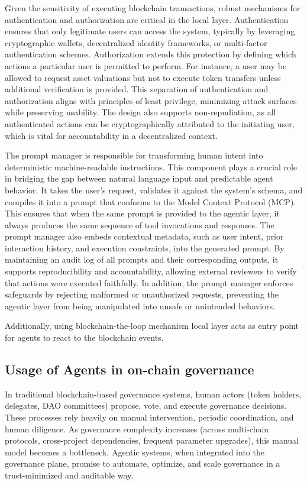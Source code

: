 Given the sensitivity of executing blockchain transactions, robust mechanisms for authentication and authorization are critical in the local layer. Authentication ensures that only legitimate users can access the system, typically by leveraging cryptographic wallets, decentralized identity frameworks, or multi-factor authentication schemes. Authorization extends this protection by defining which actions a particular user is permitted to perform. For instance, a user may be allowed to request asset valuations but not to execute token transfers unless additional verification is provided. This separation of authentication and authorization aligns with principles of least privilege, minimizing attack surfaces while preserving usability. The design also supports non-repudiation, as all authenticated actions can be cryptographically attributed to the initiating user, which is vital for accountability in a decentralized context.

The prompt manager is responsible for transforming human intent into deterministic machine-readable instructions. This component plays a crucial role in bridging the gap between natural language input and predictable agent behavior. It takes the user’s request, validates it against the system’s schema, and compiles it into a prompt that conforms to the Model Context Protocol (MCP). This ensures that when the same prompt is provided to the agentic layer, it always produces the same sequence of tool invocations and responses. The prompt manager also embeds contextual metadata, such as user intent, prior interaction history, and execution constraints, into the generated prompt. By maintaining an audit log of all prompts and their corresponding outputs, it supports reproducibility and accountability, allowing external reviewers to verify that actions were executed faithfully. In addition, the prompt manager enforces safeguards by rejecting malformed or unauthorized requests, preventing the agentic layer from being manipulated into unsafe or unintended behaviors.


Additionally, using blockchain-the-loop mechanism local layer acts as entry point for agents to react to the blockchain events.

\subsection{Usage of Agents in on-chain governance}

In traditional blockchain-based governance systems, human actors (token holders, delegates, DAO committees) propose, vote, and execute governance decisions. These processes rely heavily on manual intervention, periodic coordination, and human diligence. As governance complexity increases (across multi-chain protocols, cross-project dependencies, frequent parameter upgrades), this manual model becomes a bottleneck. Agentic systems, when integrated into the governance plane, promise to automate, optimize, and scale governance in a trust-minimized and auditable way.

